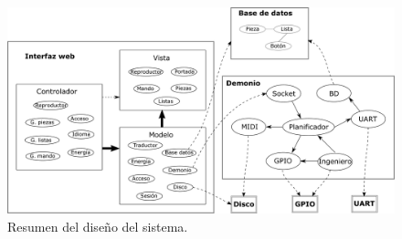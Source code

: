 \smallskip

\begin{figure}[H]
	\noindent \begin{centering}
		\includegraphics[width=\linewidth]{capitulo4/sistema}
		\par\end{centering}
	\smallskip
	\caption{\label{fig:sistema} Resumen del diseño del sistema.}
\end{figure} 

\smallskip

\clearpage{\cleardoublepage}
\clearpage{\pagestyle{empty}\cleardoublepage}